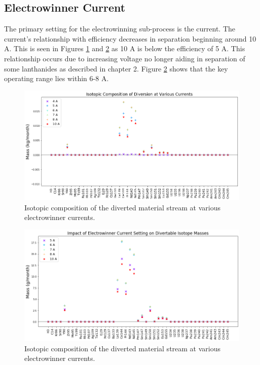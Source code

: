 \subsection{Electrowinner Current}

The primary setting for the electrowinning sub-process is the current. The current's relationship with efficiency decreases in separation beginning around 10 A.
This is seen in Figures \ref{fig:win-cur-sa} and \ref{fig:win-cur-diff} as 10 A is below the efficiency of 5 A. This relationship occurs due to increasing voltage no longer aiding in separation of some lanthanides as described in chapter 2. Figure \ref{fig:win-cur-diff} shows that the key operating range lies within 6-8 A.

\begin{figure}
	\includegraphics[width=\linewidth]{images/current-sa-comp}
	\caption{Isotopic composition of the diverted material stream at various electrowinner currents.}
	\label{fig:win-cur-sa}
\end{figure}

\begin{figure}
	\includegraphics[width=\linewidth]{images/current-sa-diff}
	\caption{Isotopic composition of the diverted material stream at various electrowinner currents.}
	\label{fig:win-cur-diff}
\end{figure}


